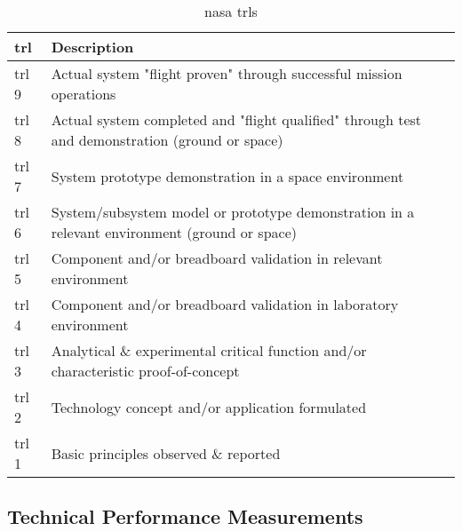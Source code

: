 \begin{table}
	\caption[\acrlong{nasa} ]{\gls{nasa} \glspl{trl} \cite{NASA2007}}
	\begin{tabular}{|p{}|p{}|}
		\hline
		\textbf{\acrfull{trl}} & \textbf{Description} \\ \hline \hline
		\gls{trl} 9& Actual system "flight proven" through successful mission operations\\
		\gls{trl} 8& Actual system completed and "flight qualified" through test and demonstration (ground or space)\\
		\gls{trl} 7& System prototype demonstration in a space environment\\
		\gls{trl} 6& System/subsystem model or prototype demonstration in a relevant environment (ground or space)\\
		\gls{trl} 5& Component and/or breadboard validation in relevant environment\\
		\gls{trl} 4& Component and/or breadboard validation in laboratory environment\\
		\gls{trl} 3& Analytical \& experimental critical function and/or characteristic proof-of-concept\\
		\gls{trl} 2& Technology concept and/or application formulated\\
		\gls{trl} 1& Basic principles observed \& reported \\
		\hline
	\end{tabular}
\end{table}
\subsection{Technical Performance Measurements}
\label{subsec:tpms}